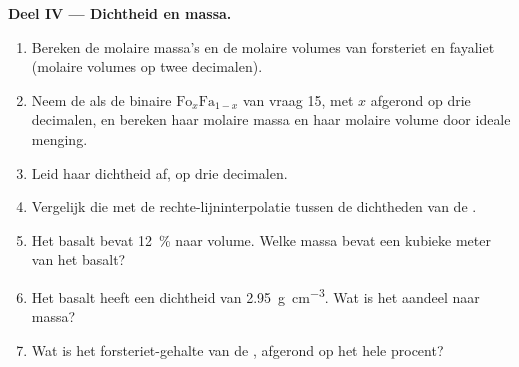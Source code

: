 \begin{problem}
\medskip
\noindent\textbf{Deel IV --- Dichtheid en massa.}
\begin{enumerate}[resume]
  \item Bereken de molaire massa's en de molaire volumes van forsteriet en fayaliet (molaire volumes op twee decimalen).
  \item Neem de  als de binaire $\mathrm{Fo}_x\mathrm{Fa}_{1-x}$ van vraag 15, met $x$ afgerond op drie decimalen, en bereken
        haar molaire massa en haar molaire volume door ideale menging.
  \item Leid haar dichtheid af, op drie decimalen.
  \item Vergelijk die met de rechte-lijninterpolatie tussen de dichtheden van de .
  \item Het basalt bevat \qty{12}{\percent}  naar volume. Welke massa  bevat een kubieke meter van het basalt?
  \item Het basalt heeft een dichtheid van \qty{2.95}{g.cm^{-3}}. Wat is het aandeel  naar massa?
  \item Wat is het forsteriet-gehalte van de , afgerond op het hele procent?
\end{enumerate}
\end{problem}
